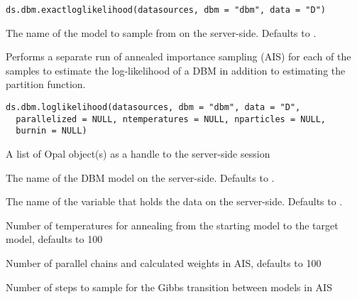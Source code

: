 %
\begin{Usage}
\begin{verbatim}
ds.dbm.exactloglikelihood(datasources, dbm = "dbm", data = "D")
\end{verbatim}
\end{Usage}
%
\begin{Arguments}
\begin{ldescription}
\item[\code{dbm}] The name of the model to sample from on the server-side. Defaults to .
\end{ldescription}
\end{Arguments}
%
\begin{Description}\relax
Performs a separate run of annealed importance sampling (AIS)
for each of the samples to estimate the log-likelihood of a DBM in addition to
estimating the partition function.
\end{Description}
%
\begin{Usage}
\begin{verbatim}
ds.dbm.loglikelihood(datasources, dbm = "dbm", data = "D",
  parallelized = NULL, ntemperatures = NULL, nparticles = NULL,
  burnin = NULL)
\end{verbatim}
\end{Usage}
%
\begin{Arguments}
\begin{ldescription}
\item[\code{datasources}] A list of Opal object(s) as a handle to the server-side session

\item[\code{dbm}] The name of the DBM model on the server-side. Defaults to .

\item[\code{data}] The name of the variable that holds the data on the server-side.
Defaults to .

\item[\code{ntemperatures}] Number of temperatures for annealing from the starting model
to the target model, defaults to 100

\item[\code{nparticles}] Number of parallel chains and calculated weights in AIS, defaults to 100

\item[\code{burnin}] Number of steps to sample for the Gibbs transition between models in AIS
\end{ldescription}
\end{Arguments}
